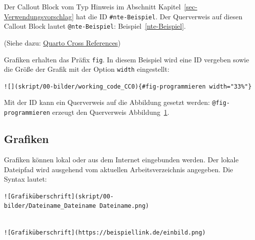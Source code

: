 \documentclass[
  letterpaper,
  DIV=11]{scrartcl}
\begin{document}
Der Callout Block vom Typ Hinweis im Abschnitt
Kapitel~\ref{sec-Verwendungsvorschlag} hat die ID
\texttt{\#nte-Beispiel}. Der Querverweis auf diesen Callout Block lautet
\texttt{@nte-Beispiel}: Beispiel~\ref{nte-Beispiel}.

(Siehe dazu:
\href{https://quarto.org/docs/authoring/cross-references.html}{Quarto
Cross References})

Grafiken erhalten das Präfix \texttt{fig}. In diesem Beispiel wird eine
ID vergeben sowie die Größe der Grafik mit der Option \texttt{width}
eingestellt:

\texttt{!{[}{]}(skript/00-bilder/working\_code\_CC0)\{\#fig-programmieren\ width="33\%"\}}

\begin{figure}


\caption{\label{fig-programmieren}}

\end{figure}%

Mit der ID kann ein Querverweis auf die Abbildung gesetzt werden:
\texttt{@fig-programmieren} erzeugt den Querverweis
Abbildung~\ref{fig-programmieren}.

\subsection{Grafiken}\label{grafiken}

Grafiken können lokal oder aus dem Internet eingebunden werden. Der
lokale Dateipfad wird ausgehend vom aktuellen Arbeitsverzeichnis
angegeben. Die Syntax lautet:

\texttt{!{[}Grafiküberschrift{]}(skript/00-bilder/Dateiname\_Dateiname\ Dateiname.png)}\strut \\
\texttt{!{[}Grafiküberschrift{]}(https://beispiellink.de/einbild.png)}
\end{document}
